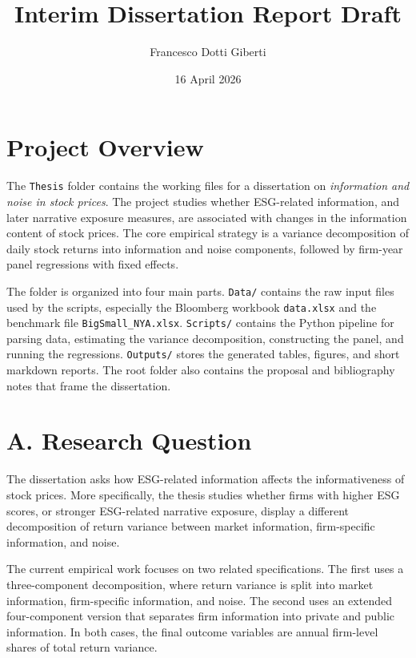\documentclass[12pt]{article}
\begin{document}
\title{Interim Dissertation Report Draft}
\author{Francesco Dotti Giberti}
\date{16 April 2026}
\maketitle

\section*{Project Overview}
The \texttt{Thesis} folder contains the working files for a dissertation on \emph{information and noise in stock prices}. The project studies whether ESG-related information, and later narrative exposure measures, are associated with changes in the information content of stock prices. The core empirical strategy is a variance decomposition of daily stock returns into information and noise components, followed by firm-year panel regressions with fixed effects.

The folder is organized into four main parts. \texttt{Data/} contains the raw input files used by the scripts, especially the Bloomberg workbook \texttt{data.xlsx} and the benchmark file \texttt{BigSmall_NYA.xlsx}. \texttt{Scripts/} contains the Python pipeline for parsing data, estimating the variance decomposition, constructing the panel, and running the regressions. \texttt{Outputs/} stores the generated tables, figures, and short markdown reports. The root folder also contains the proposal and bibliography notes that frame the dissertation.

\section*{A. Research Question}
The dissertation asks how ESG-related information affects the informativeness of stock prices. More specifically, the thesis studies whether firms with higher ESG scores, or stronger ESG-related narrative exposure, display a different decomposition of return variance between market information, firm-specific information, and noise.

The current empirical work focuses on two related specifications. The first uses a three-component decomposition, where return variance is split into market information, firm-specific information, and noise. The second uses an extended four-component version that separates firm information into private and public information. In both cases, the final outcome variables are annual firm-level shares of total return variance.
\end{document}
